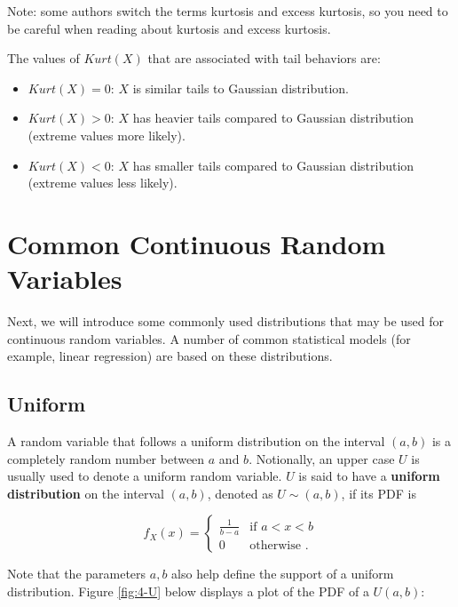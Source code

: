 \documentclass[
]{book}
\providecommand{\tightlist}{%
  \setlength{\itemsep}{0pt}\setlength{\parskip}{0pt}}
\begin{document}
Note: some authors switch the terms kurtosis and excess kurtosis, so you need to be careful when reading about kurtosis and excess kurtosis.

The values of \(Kurt(X)\) that are associated with tail behaviors are:

\begin{itemize}
\tightlist
\item
  \(Kurt(X) = 0\): \(X\) is similar tails to Gaussian distribution.
\item
  \(Kurt(X) > 0\): \(X\) has heavier tails compared to Gaussian distribution (extreme values more likely).
\item
  \(Kurt(X) < 0\): \(X\) has smaller tails compared to Gaussian distribution (extreme values less likely).
\end{itemize}

\hypertarget{commContRVs}{%
\section{Common Continuous Random Variables}\label{commContRVs}}

Next, we will introduce some commonly used distributions that may be used for continuous random variables. A number of common statistical models (for example, linear regression) are based on these distributions.

\hypertarget{uniform}{%
\subsection{Uniform}\label{uniform}}

A random variable that follows a uniform distribution on the interval \((a,b)\) is a completely random number between \(a\) and \(b\). Notionally, an upper case \(U\) is usually used to denote a uniform random variable. \(U\) is said to have a \textbf{uniform distribution} on the interval \((a,b)\), denoted as \(U \sim(a,b)\), if its PDF is

\begin{equation} 
f_X(x) = \begin{cases} 
  \frac{1}{b-a} & \text{if } a<x<b \\
  0 & \text{otherwise }. 
\end{cases}
\label{eq:4-U}
\end{equation}

Note that the parameters \(a,b\) also help define the support of a uniform distribution. Figure \ref{fig:4-U} below displays a plot of the PDF of a \(U(a,b)\):
\end{document}
